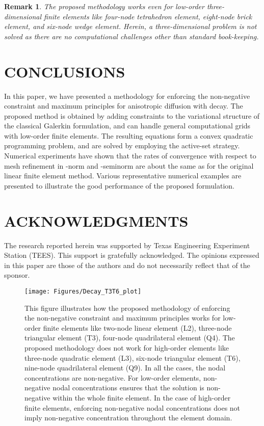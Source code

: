 \documentclass[11pt]{amsart}
\newtheorem{remark}[theorem]{Remark}
\begin{document}
\begin{remark}
  The proposed methodology works even for low-order three-dimensional finite 
  elements like four-node tetrahedron element, eight-node brick element, and 
  six-node wedge element. Herein, a three-dimensional problem is not solved 
  as there are no computational challenges other than standard book-keeping.
\end{remark} 
\section{CONCLUSIONS}
\label{Sec:Decay_Conclusions}
In this paper, we have presented a methodology for enforcing the 
non-negative constraint and maximum principles for anisotropic 
diffusion with decay. The proposed method is obtained by adding 
constraints to the variational structure of the classical Galerkin 
formulation, and can handle general computational grids with low-order 
finite elements. The resulting equations form a convex quadratic 
programming problem, and are solved by employing the active-set 
strategy. Numerical experiments have shown that the rates of 
convergence with respect to mesh refinement in -norm 
and -seminorm are about the same as for the original 
linear finite element method. Various representative numerical 
examples are presented to illustrate the good performance of 
the proposed formulation.  


\section*{ACKNOWLEDGMENTS}
The research reported herein was supported by Texas Engineering Experiment Station 
(TEES). This support is gratefully acknowledged. The opinions expressed in this paper 
are those of the authors and do not necessarily reflect that of the sponsor. 




\clearpage 
\newpage

\begin{figure}[h]
  \centering	
  \texttt{[image: Figures/Decay\_T3T6\_plot]}
  \caption{This figure illustrates how the proposed methodology of 
    enforcing the non-negative constraint and maximum principles 
    works for low-order finite elements like two-node linear element 
    (L2), three-node triangular element (T3), four-node quadrilateral 
    element (Q4). The proposed methodology does not  work for high-order 
    elements like three-node quadratic element (L3), six-node triangular 
    element (T6), nine-node quadrilateral element (Q9). In all the cases, 
    the nodal concentrations are non-negative. For low-order elements, 
    non-negative nodal concentrations ensures that the solution is 
    non-negative within the whole finite element. In the case of 
    high-order finite elements, enforcing non-negative nodal 
    concentrations does not imply non-negative concentration 
    throughout the element domain.} \label{Fig:Decay_T3T6_plot}
\end{figure}
\end{document}
